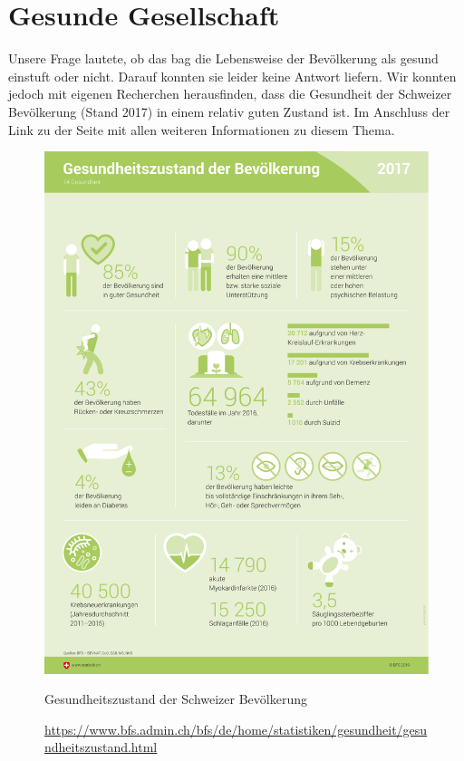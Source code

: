 \section{Gesunde Gesellschaft}
Unsere Frage lautete, ob das \acs{bag} die Lebensweise der Bevölkerung als gesund einstuft oder nicht. Darauf konnten sie leider keine Antwort liefern. Wir konnten jedoch mit eigenen Recherchen herausfinden, dass die Gesundheit der Schweizer Bevölkerung (Stand 2017) in einem relativ guten Zustand ist. Im Anschluss der Link zu der Seite mit allen weiteren Informationen zu diesem Thema.
\begin{figure}[H]
  \centering
  \includegraphics[width=0.75\linewidth]{./images/gesundheitszustand_der_bevoelkerung.png}
  \caption{Gesundheitszustand der Schweizer Bevölkerung}
  \label{fig:gesundheitszustand}
  \caption*{\url{https://www.bfs.admin.ch/bfs/de/home/statistiken/gesundheit/gesundheitszustand.html}}
\end{figure}
